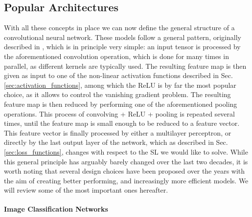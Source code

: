 \subsection{Popular Architectures}
\label{sec:architectures}

With all these concepts in place we can now define the general structure of a convolutional neural network. These models follow a general pattern, originally described in \cite{lecun1998gradient}, which is in principle very simple: an input tensor is processed by the aforementioned convolution operation, which is done for many times in parallel, as different kernels are typically used. The resulting feature map is then given as input to one of the non-linear activation functions described in Sec. \ref{sec:activation_functions}, among which the ReLU is by far the most popular choice, as it allows to control the vanishing gradient problem. The resulting feature map is then reduced by performing one of the aforementioned pooling operations. This process of convolving + ReLU + pooling is repeated several times, until the feature map is small enough to be reduced to a feature vector. This feature vector is finally processed by either a multilayer perceptron, or directly by the last output layer of the network, which as described in Sec. \ref{sec:loss_functions}, changes with respect to the SL we would like to solve. While this general principle has arguably barely changed over the last two decades, it is worth noting that several design choices have been proposed over the years with the aim of creating better performing, and increasingly more efficient models. We will review some of the most important ones hereafter.  

\paragraph{Image Classification Networks}

